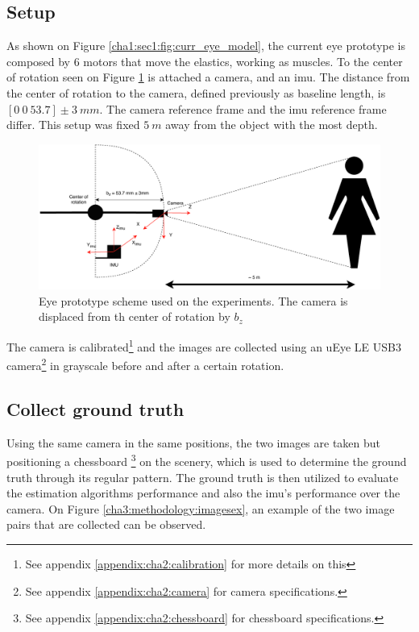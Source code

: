 \subsection{Setup}
As shown on Figure \ref{cha1:sec1:fig:curr_eye_model}, the current eye prototype is composed by 6 motors that move the elastics, working as muscles. To the center of rotation seen on Figure \ref{cha4:sec3:eyescheme} is attached a camera, and an \acrshort{imu}. The distance from the center of rotation to the camera, defined previously as baseline length, is $[0 \ 0 \ 53.7] \pm 3 \ mm $. The camera reference frame and the \acrshort{imu} reference frame differ. 
This setup was fixed $5 \ m$ away from the object with the most depth.
\begin{figure}[ht]
	\centering
	\includegraphics[width=\textwidth]{images/eyescheme.pdf}
	\caption[Eye prototype scheme used on the experiments]{Eye prototype scheme used on the experiments. The camera is displaced from th center of rotation by $b_z$ }
	\label{cha4:sec3:eyescheme}
\end{figure}

The camera is calibrated\footnote{See appendix \ref{appendix:cha2:calibration} for more details on this} and the images are collected using an uEye LE USB3 camera\footnote{See appendix \ref{appendix:cha2:camera} for camera specifications.} in grayscale before and after a certain rotation.

\subsection{Collect ground truth}
\label{rnfrfref}
Using the same camera in the same positions, the two images are taken but positioning a chessboard \footnote{See appendix \ref{appendix:cha2:chessboard} for chessboard specifications.} on the scenery, which is used to determine the ground truth through its regular pattern. The ground truth is then utilized to evaluate the estimation algorithms performance and also the \acrshort{imu}'s performance over the camera. On Figure \ref{cha3:methodology:imagesex}, an example of the two image pairs that are collected can be observed.
	
